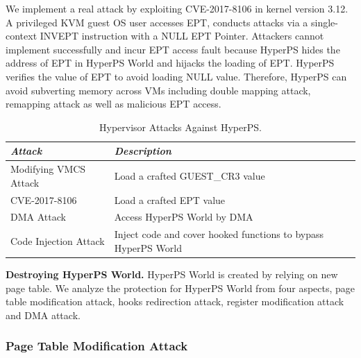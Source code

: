 ﻿\documentclass[conference]{IEEEtran}
\begin{document}
We implement a real attack by exploiting CVE-2017-8106 in kernel version 3.12. A privileged KVM guest OS user accesses EPT, conducts attacks via a single-context INVEPT instruction with a NULL EPT Pointer. Attackers cannot implement successfully and incur EPT access fault because HyperPS hides the address of EPT in HyperPS World and hijacks the loading of EPT. HyperPS verifies the value of EPT to avoid loading NULL value. Therefore, HyperPS can avoid subverting memory across VMs including double mapping attack, remapping attack as well as malicious EPT access.


\begin{table}
\centering
\caption{Hypervisor Attacks Against HyperPS.}\label{tab3}
\begin{tabular}{p{2.8cm}|p{5.5cm}}
\hline
{\itshape\bfseries Attack} & {\itshape\bfseries Description} \\
\hline
Modifying VMCS Attack & Load a crafted GUEST\_CR3 value\\
\hline
CVE-2017-8106 & Load a crafted EPT value \\
\hline
DMA Attack & Access HyperPS World by DMA \\
\hline
Code Injection Attack & Inject code and cover hooked functions to bypass HyperPS World \\
\hline
\end{tabular}
\end{table}

\textbf{Destroying HyperPS World.}
HyperPS World is created by relying on new page table.
We analyze the protection for HyperPS World from four aspects, page table modification attack, hooks redirection attack, register modification attack and DMA attack.


\subsubsection{Page Table Modification Attack}
\end{document}
